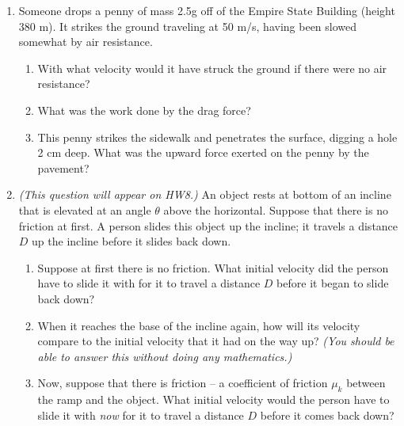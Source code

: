 \documentclass[12pt]{article}
\begin{document}
\begin{enumerate}

\item{Someone drops a penny of mass 2.5g off of the Empire State Building (height 380 m). It strikes the ground traveling at 50 m/s, having been slowed somewhat by air resistance.}
\begin{enumerate}
	\item{With what velocity would it have struck the ground if there were no air resistance?}
	\vspace{2in}
	\item{What was the work done by the drag force?}
	\vspace{2in}
	\item{This penny strikes the sidewalk and penetrates the surface, digging a hole 2 cm deep. What was the upward force exerted on the penny by the pavement?}
	\vspace{2in}
\end{enumerate}

\newpage


\item{{\it (This question will appear on HW8.)} An object rests at bottom of an incline that is elevated at an angle $\theta$ above the horizontal. Suppose that there is no friction at first. A person slides this object up the incline; it travels a distance $D$ up the incline before it slides back down.}
	
	\begin{enumerate}

	
\item	Suppose at first there is no friction. What initial velocity did the person have to slide it with for it to travel a distance $D$ before it began to slide back down? 
	
	\vspace{2in}
	
\item	When it reaches the base of the incline again, how will its velocity compare to the initial velocity that it had on the way up? {\it (You should be able to answer this without doing any mathematics.)}
	
	\vspace{2in}
	
	\newpage
	
\item	Now, suppose that there is friction -- a coefficient of friction $\mu_k$ between the ramp and the object. 
What initial velocity would the person have to slide it with {\it now} for it to travel a distance $D$ before it comes back down?


\end{enumerate}
\end{enumerate}
\end{document}
